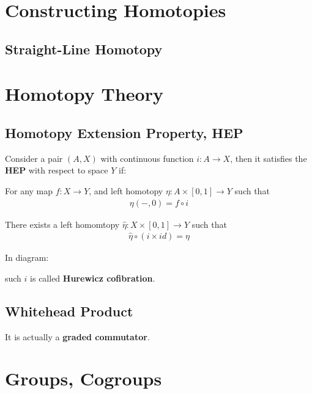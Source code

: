 \documentclass[Total.tex]{subfiles}
\begin{document}
		\section{Constructing Homotopies}
			\subsection{Straight-Line Homotopy}
		\section{Homotopy Theory}
		
			\subsection{Homotopy Extension Property, HEP}
				\begin{Def}
					Consider a pair $(A,X)$ with continuous function $i:A\rightarrow X$, then it satisfies the \textbf{HEP} with respect to space $Y$ if:
					
					For any map $f:X\rightarrow Y$, and left homotopy $\eta:A\times [0,1]\rightarrow Y$ such that
					\begin{gather*}
						\eta(-,0)=f\circ i
					\end{gather*}
					
					There exists a left homomtopy $\hat{\eta}:X\times [0,1]\rightarrow Y$ such that
					\begin{gather*}
						\hat{\eta}\circ (i\times id)=\eta
					\end{gather*}
				\end{Def}
				
				In diagram:
				\begin{center}
				\end{center}
				
				such $i$ is called \textbf{Hurewicz cofibration}.
			\subsection{Whitehead Product}
				\begin{Def}
					It is actually a \textbf{graded commutator}.
				\end{Def}
		\section{Groups, Cogroups}
\end{document}
